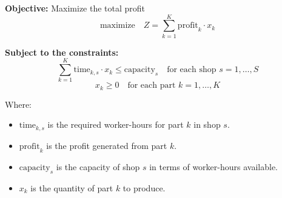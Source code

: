 \documentclass{article}
\begin{document}
\textbf{Objective:}
Maximize the total profit
\[
\text{maximize} \quad Z = \sum_{k=1}^{K} \text{profit}_k \cdot x_k
\]

\textbf{Subject to the constraints:}
\[
\sum_{k=1}^{K} \text{time}_{k, s} \cdot x_k \leq \text{capacity}_s \quad \text{for each shop } s = 1, \ldots, S
\]
\[
x_k \geq 0 \quad \text{for each part } k = 1, \ldots, K
\]

\noindent Where:
\begin{itemize}
    \item \( \text{time}_{k, s} \) is the required worker-hours for part \( k \) in shop \( s \).
    \item \( \text{profit}_k \) is the profit generated from part \( k \).
    \item \( \text{capacity}_s \) is the capacity of shop \( s \) in terms of worker-hours available.
    \item \( x_k \) is the quantity of part \( k \) to produce.
\end{itemize}
\end{document}
